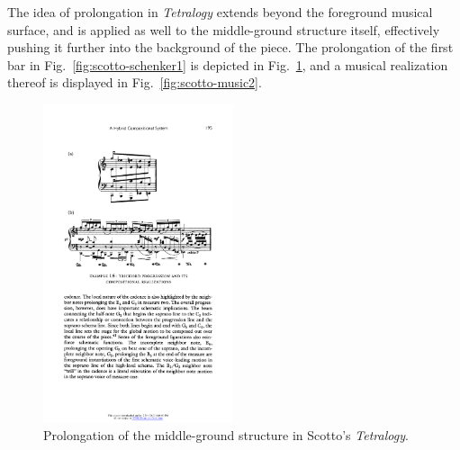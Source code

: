 \begin{example}
	\noindent The idea of prolongation in \emph{Tetralogy} extends beyond the foreground musical surface, and is applied as well to the middle-ground structure itself, effectively pushing it further into the background of the piece. The prolongation of the first bar in Fig.~\ref{fig:scotto-schenker1} is depicted in Fig.~\ref{fig:scotto-schenker2}, and a musical realization thereof is displayed in Fig.~\ref{fig:scotto-music2}. 
	
	\begin{figure}[htbp]
    	\centering
    	\includegraphics[width=2.2in]{figures/scotto-schenker2.pdf}
    	\caption[Prolongation of the middle-ground structure in Scotto's \emph{Tetralogy}]{Prolongation of the middle-ground structure in Scotto's \emph{Tetralogy}.}
    	\label{fig:scotto-schenker2}
	\end{figure}
	

\end{example}
